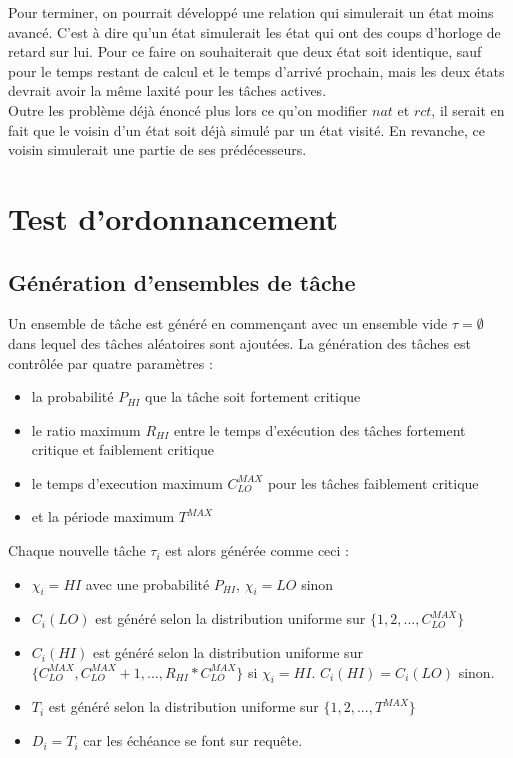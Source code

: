 \documentclass[11pt,a4paper,oneside]{book}
\theoremstyle{break}
\theoremstyle{breakplain}
\begin{document}
Pour terminer, on pourrait développé une relation qui simulerait un état moins avancé. C'est à dire qu'un état simulerait les état qui ont des coups d'horloge de retard sur lui. Pour ce faire on souhaiterait que deux état soit identique, sauf pour le temps restant de calcul et le temps d'arrivé prochain, mais les deux états devrait avoir la même laxité pour les tâches actives.\\
Outre les problème déjà énoncé plus lors ce qu'on modifier $nat$ et $rct$, il serait en fait que le voisin d'un état soit déjà simulé par un état visité. En revanche, ce voisin simulerait une partie de ses prédécesseurs.



\chapter{Test d'ordonnancement}

\section{Génération d'ensembles de tâche}
Un ensemble de tâche est généré\cite{ekberg2014bounding} en commençant avec un ensemble vide $\tau = \emptyset$ dans lequel des tâches aléatoires sont ajoutées. La génération des tâches est contrôlée par quatre paramètres :
\begin{itemize}
\item la probabilité $P_{HI}$ que la tâche soit fortement critique
\item le ratio maximum $R_{HI}$ entre le temps d'exécution des tâches fortement critique et faiblement critique
\item le temps d'execution maximum $C^{MAX}_{LO}$ pour les tâches faiblement critique
\item et la période maximum $T^{MAX}$
\end{itemize}
Chaque nouvelle tâche $\tau_i$ est alors générée comme ceci :
\begin{itemize}
\item $\chi_i = HI$ avec une probabilité $P_{HI}$, $\chi_i = LO$ sinon
\item $C_i(LO)$ est généré selon la distribution uniforme sur $\{1,2,...,C^{MAX}_{LO}\}$
\item $C_i(HI)$ est généré selon la distribution uniforme sur $\{C^{MAX}_{LO},C^{MAX}_{LO}+1,...,R_{HI}*C^{MAX}_{LO}\}$ si $\chi_i = HI$. $C_i(HI) = C_i(LO)$ sinon.
\item $T_i$ est généré selon la distribution uniforme sur $\{1,2,...,T^{MAX}\}$
\item $D_i = T_i$ car les échéance se font sur requête.
\end{itemize}
\end{document}
